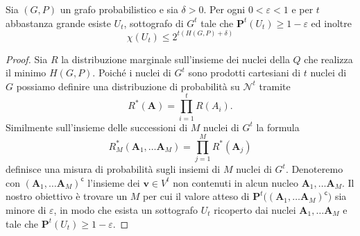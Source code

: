 \begin{theorem}[K\"orner]
	Sia \((G,P)\) un grafo probabilistico e sia \(\delta>0\). Per ogni \(0<\varepsilon<1\) e per \(t\) abbastanza grande esiste \(U_{t}\), sottografo di \(G^{t}\) tale che \(\mathbf{P}^t(U_{t})\ge 1-\varepsilon\) ed inoltre
	\[\chi(U_{t})\le 2^{t(H(G,P)+\delta)}\]
\end{theorem}
\begin{proof}
	Sia \(R\) la distribuzione marginale sull'insieme dei nuclei della \(Q\) che realizza il minimo \(H(G,P)\). Poiché i nuclei di \(G^t\) sono prodotti cartesiani di \(t\) nuclei di \(G\) possiamo definire una distribuzione di probabilità su \(\mathcal{N}^t\) tramite
	\[R^{*}(\mathbf{A}) = \prod_{i=1}^t R(A_{i}).\]
	Similmente sull'insieme delle successioni di \(M\) nuclei di \(G^t\) la formula
	\[R_{M}^{*}(\mathbf{A}_{1},\dots\mathbf{A}_{M}) = \prod_{j=1}^M R^{*}(\mathbf{A}_j)\]
	definisce una misura di probabilità sugli insiemi di \(M\) nuclei di \(G^t\). Denoteremo con \((\mathbf{A}_{1},\dots\mathbf{A}_{M})^{\mathsf{c}}\) l'insieme dei \(\mathbf{v}\in V^{t}\) non contenuti in alcun nucleo \(\mathbf{A}_{1},\dots\mathbf{A}_{M}\). Il nostro obiettivo è trovare un \(M\) per cui il valore atteso di \(\mathbf{P}^t\big((\mathbf{A}_{1},\dots\mathbf{A}_{M})^{\mathsf{c}}\big)\) sia minore di \(\varepsilon\), in modo che esista un sottografo \(U_{t}\) ricoperto dai nuclei \(\mathbf{A}_{1},\dots\mathbf{A}_{M}\) e tale che \(\mathbf{P}^t(U_{t})\ge 1-\varepsilon\).
	

\end{proof}
